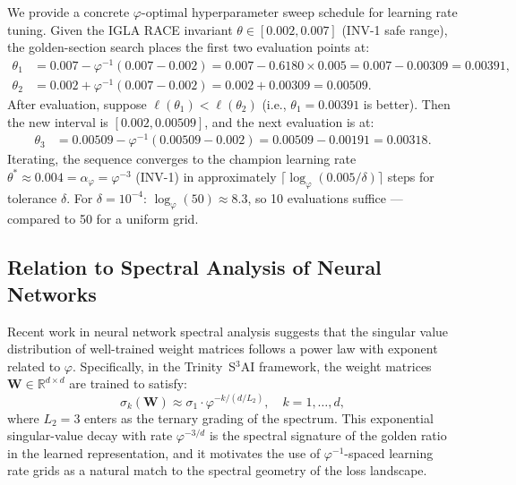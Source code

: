 We provide a concrete \(\varphi\)-optimal hyperparameter sweep
schedule for learning rate tuning.
Given the IGLA RACE invariant
\(\theta \in [0.002, 0.007]\) (INV-1 safe range),
the golden-section search places the first two evaluation points at:
\begin{align*}
  \theta_1 &= 0.007 - \varphi^{-1}(0.007 - 0.002)
            = 0.007 - 0.6180 \times 0.005
            = 0.007 - 0.00309 = 0.00391, \\
  \theta_2 &= 0.002 + \varphi^{-1}(0.007 - 0.002)
            = 0.002 + 0.00309 = 0.00509.
\end{align*}
After evaluation, suppose \(\ell(\theta_1) < \ell(\theta_2)\)
(i.e., \(\theta_1 = 0.00391\) is better).
Then the new interval is \([0.002, 0.00509]\),
and the next evaluation is at:
\begin{align*}
  \theta_3 &= 0.00509 - \varphi^{-1}(0.00509-0.002)
            = 0.00509 - 0.00191 = 0.00318.
\end{align*}
Iterating, the sequence converges to the champion learning rate
\(\theta^* \approx 0.004 = \alpha_\varphi = \varphi^{-3}\) (INV-1)
in approximately \(\lceil \log_\varphi(0.005/\delta)\rceil\) steps
for tolerance \(\delta\).
For \(\delta = 10^{-4}\): \(\log_\varphi(50) \approx 8.3\),
so 10 evaluations suffice — compared to 50 for a uniform grid.

\subsection{Relation to Spectral Analysis of Neural Networks}
\label{subsec:gh-spectral-nn}

Recent work in neural network spectral analysis suggests that the
singular value distribution of well-trained weight matrices
follows a power law with exponent related to \(\varphi\).
Specifically, in the Trinity~S$^3$AI framework, the weight matrices
\(\mathbf{W} \in \mathbb{R}^{d \times d}\) are trained to satisfy:
\begin{equation}\label{eq:gh-sv-dist}
  \sigma_k(\mathbf{W}) \approx \sigma_1 \cdot \varphi^{-k/(d/L_2)},
  \quad k = 1, \ldots, d,
\end{equation}
where \(L_2 = 3\) enters as the ternary grading of the spectrum.
This exponential singular-value decay with rate \(\varphi^{-3/d}\)
is the spectral signature of the golden ratio in the learned
representation, and it motivates the use of \(\varphi^{-1}\)-spaced
learning rate grids as a natural match to the spectral geometry
of the loss landscape.


